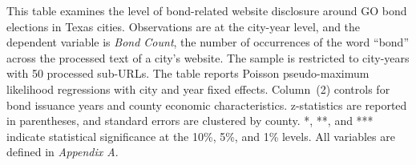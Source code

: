 \clearpage
\begin{table}[H]\centering
\def\sym#1{\ifmmode^{#1}\else\(^{#1}\)\fi}
\begingroup
\caption{\textbf{Texas GO bond referendums and website disclosure: Poisson specification}}
\label{tab:tx_election_time_series_poisson}

\parbox{\textwidth}{This table examines the level of bond-related website disclosure around GO bond elections in Texas cities. Observations are at the city-year level, and the dependent variable is \textit{Bond Count}, the number of occurrences of the word ``bond'' across the processed text of a city's website. The sample is restricted to city-years with 50 processed sub-URLs. The table reports Poisson pseudo-maximum likelihood regressions with city and year fixed effects. Column~(2) controls for bond issuance years and county economic characteristics. z-statistics are reported in parentheses, and standard errors are clustered by county. *, **, and *** indicate statistical significance at the 10\%, 5\%, and 1\% levels. All variables are defined in \textit{Appendix A}.}
\endgroup
\end{table}


